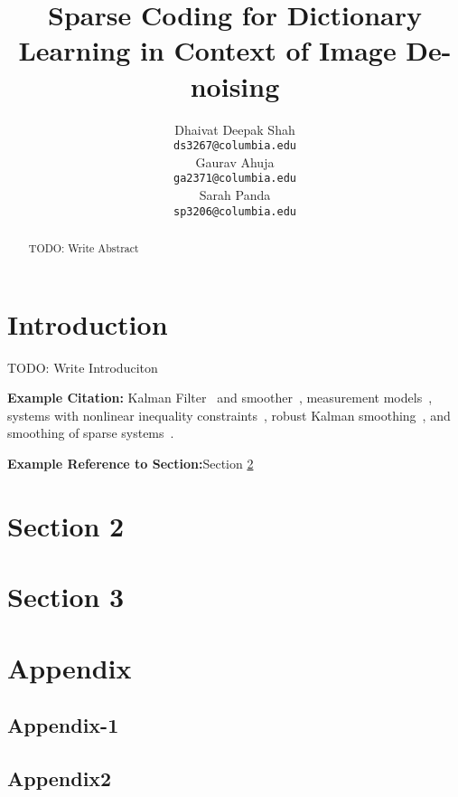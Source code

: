\documentclass{article} %
\title{Sparse Coding for Dictionary Learning in Context of Image De-noising}
\author{
Dhaivat Deepak Shah\\
\texttt{ds3267@columbia.edu} \\
\And
Gaurav Ahuja\\
\texttt{ga2371@columbia.edu} \\
\And
Sarah Panda\\
\texttt{sp3206@columbia.edu} \\
}
\begin{document}
\maketitle

\begin{abstract}
TODO: Write Abstract
\end{abstract}

\vspace{-.2cm}
\section{Introduction}
\label{EGintroduction}
\vspace{-.2cm}
TODO: Write Introduciton

\textbf{Example Citation:} Kalman Filter~\cite{kalman} and smoother~\cite{RTS}, 
measurement models~\cite{Bell1994}, systems with nonlinear inequality
constraints~\cite{Bell2008}, robust Kalman smoothing~\cite{RobustSparseArxiv, StArxiv, Aravkin2011tac}, and smoothing of sparse systems~\cite{Angelosante2009}. 

\textbf{Example Reference to Section:}Section \ref{Section2}


\vspace{-.2cm}
\section{Section 2}
\label{Section2}
\vspace{-.2cm}

\vspace{-.2cm}
\section{Section 3}
\label{Secton3}
\vspace{-.2cm}




\newpage
\section{Appendix}


\subsection{Appendix-1}
\label{sec:Appendix1}
 

\subsection{Appendix2}
\label{Appendix2}
\end{document}
